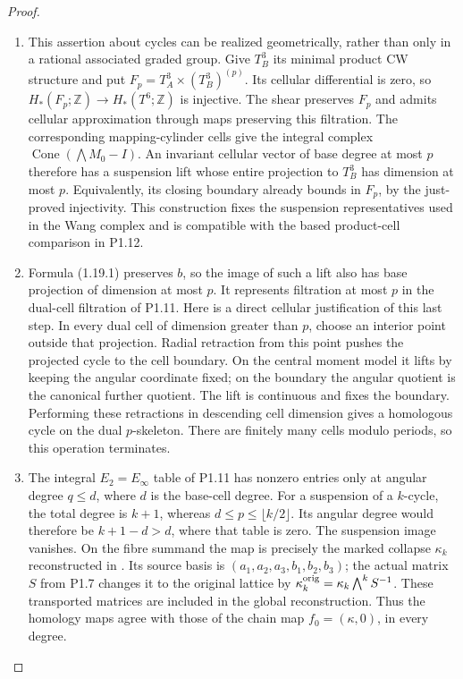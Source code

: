 \begin{proof}
\begin{enumerate}[label=\arabic*.]
\item This assertion about cycles can be realized geometrically, rather
than only in a rational associated graded group.  Give $T_B^3$ its
minimal product CW structure and put
$F_p=T_A^3\times(T_B^3)^{(p)}$.
Its cellular differential is zero, so
$H_*(F_p;\mathbb Z)\to H_*(T^6;\mathbb Z)$ is injective.
The shear preserves $F_p$ and admits cellular approximation through
maps preserving this filtration.  The corresponding mapping-cylinder
cells give the integral complex
$\operatorname{Cone}(\bigwedge M_0-I)$.
An invariant cellular vector of base degree at most $p$ therefore
has a suspension lift whose entire projection to $T_B^3$ has dimension
at most $p$.  Equivalently, its closing boundary already bounds in
$F_p$, by the just-proved injectivity.  This construction fixes the
suspension representatives used in the Wang complex and is compatible
with the based product-cell comparison in P1.12.

\item Formula (1.19.1) preserves $b$, so the image of such a lift also has
base projection of dimension at most $p$.  It represents filtration
at most $p$ in the dual-cell filtration of P1.11.  Here is a direct
cellular justification of this last step.  In every dual cell of
dimension greater than $p$, choose an interior point outside that
projection.  Radial retraction from this point pushes the projected
cycle to the cell boundary.  On the central moment model it lifts
by keeping the angular coordinate fixed; on the boundary the angular
quotient is the canonical further quotient.  The lift is continuous
and fixes the boundary.  Performing these retractions in descending
cell dimension gives a homologous cycle on the dual $p$-skeleton.
There are finitely many cells modulo periods, so this operation
terminates.

\item The integral $E_2=E_\infty$ table of P1.11 has nonzero entries only
at angular degree $q\leq d$, where $d$ is the base-cell degree.
For a suspension of a $k$-cycle, the total degree is $k+1$, whereas
$d\leq p\leq\lfloor k/2\rfloor$. Its angular degree would therefore
be $k+1-d>d$, where that table is zero.  The suspension image
vanishes.  On the fibre summand the map is precisely the marked
collapse $\kappa_k$ reconstructed in
.
Its source basis is $(a_1,a_2,a_3,b_1,b_2,b_3)$; the actual matrix $S$
from P1.7 changes it to the original lattice by
$\kappa_k^{\rm orig}=\kappa_k\bigwedge^kS^{-1}$.
These transported matrices are included in the global reconstruction.  Thus the homology maps agree
with those of the chain map $f_0=(\kappa,0)$, in every degree.


\end{enumerate}
\end{proof}
